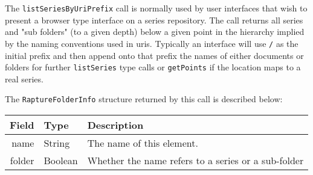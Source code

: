 The \verb+listSeriesByUriPrefix+ call is normally used by user interfaces that wish
to present a browser type interface on a series repository. The call returns all series
and "sub folders" (to a given depth) below a given point in the hierarchy implied
by the naming conventions used in uris. Typically an interface will use \verb+/+ as
the initial prefix and then append onto that prefix the names of either documents
or folders for further \verb+listSeries+ type calls or \verb+getPoints+ if the location
maps to a real series.

The \verb+RaptureFolderInfo+ structure returned by this call is described below:

\begin{table}[ht]
  \small
\begin{center}
\begin{tabular}{r l p{8cm}}
  Field & Type & Description \\
  \hline
  name & String & The name of this element. \\
  folder & Boolean & Whether the name refers to a series or a sub-folder \\
\end{tabular}
\end{center}
\end{table}
